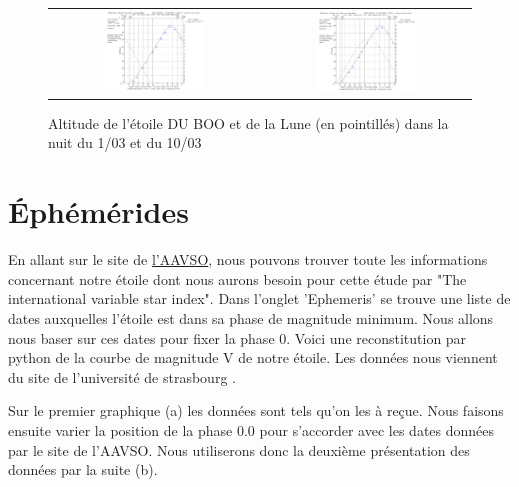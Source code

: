 \documentclass[10pt,french, openany]{book}
\begin{document}
    \begin{figure}[h!]
    \centering
    \begin{tabular}{c c}
         \includegraphics[width=0.5\textwidth]{1_3.PNG}&\includegraphics[width=0.5\textwidth]{10_3.PNG}  \\
    \end{tabular}
    \caption{Altitude de l'étoile DU BOO et de la Lune (en pointillés) dans la nuit du 1/03 et du 10/03}
    \end{figure}

    
\section{Éphémérides}\label{section:Ephémérides}
En allant sur le site de \href{https://www.aavso.org/vsx/index.php?view=detail.top&oid=4446}{l'AAVSO}, nous pouvons trouver toute les informations concernant notre étoile dont nous aurons besoin pour cette étude par "The international variable star index". Dans l'onglet 'Ephemeris' se trouve une liste de dates auxquelles l'étoile est dans sa phase de magnitude minimum. Nous allons nous baser sur ces dates pour fixer la phase 0. Voici une reconstitution par python de la courbe de magnitude V de notre étoile. Les données nous viennent du site de l'université de strasbourg \cite{site:cds}. 

Sur le premier graphique (a) les données sont tels qu'on les à reçue. Nous faisons ensuite varier la position de la phase 0.0 pour s'accorder avec les dates données par le site de l'AAVSO. Nous utiliserons donc la deuxième présentation des données par la suite (b). 
\end{document}
